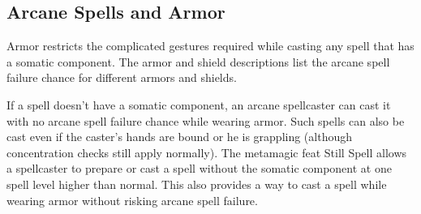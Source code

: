 \subsection{Arcane Spells and Armor}

				
Armor restricts the complicated gestures required while casting any spell that has a somatic component. The armor and shield descriptions list the arcane spell failure chance for different armors and shields.
				
If a spell doesn't have a somatic component, an arcane spellcaster can cast it with no arcane spell failure chance while wearing armor. Such spells can also be cast even if the caster's hands are bound or he is grappling (although concentration checks still apply normally). The metamagic feat Still Spell allows a spellcaster to prepare or cast a spell without the somatic component at one spell level higher than normal. This also provides a way to cast a spell while wearing armor without risking arcane spell failure.
        	